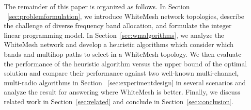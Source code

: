 The remainder of this paper is organized as follows. In Section
~\ref{sec:problemformulation}, we introduce WhiteMesh network 
topologies, describe the challenge of diverse frequency band 
allocation, and formulate the integer linear programming model. 
In Section~\ref{sec:wmalgorithms}, we analyze the WhiteMesh network
and develop a heuristic algorithms which consider which bands 
and multihop paths to select in a WhiteMesh topology.  We then 
evaluate the performance of the heuristic algorithm versus the 
upper bound of the optimal solution and compare their performance 
against two well-known multi-channel, multi-radio algorithms in Section
~\ref{sec:experimentdesign} in several scenarios and analyze the 
result for answering where WhiteMesh is better. Finally, we discuss 
related work in Section~\ref{sec:related} and conclude in Section~\ref{sec:conclusion}.
